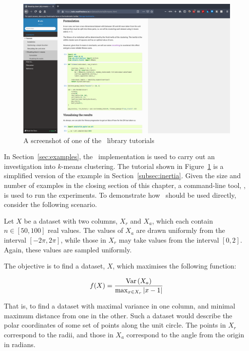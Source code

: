\graphicspath{{./}}
\begin{figure}[htbp]
    \centering
    \includegraphics[width=\imgwidth]{img/docs.png}
    \caption{A screenshot of one of the \edo\ library tutorials}
    \label{fig:docs}
\end{figure}

In Section~\ref{sec:examples}, the \edo\ implementation is used to carry out an
investigation into \(k\)-means clustering. The tutorial shown in
Figure~\ref{fig:docs} is a simplified version of the example in
Section~\ref{subsec:inertia}. Given the size and number of examples in the
closing section of this chapter, a command-line tool, \edolab, is used to run
the experiments. To demonstrate how \edo\ should be used directly, consider the
following scenario.

Let \(X\) be a dataset with two columns, \(X_r\) and \(X_a\), which each contain
\(n \in [50, 100]\) real values. The values of \(X_a\) are drawn uniformly from
the interval \([-2\pi, 2\pi]\), while those in \(X_r\) may take values from the
interval \([0, 2]\). Again, these values are sampled uniformly.

The objective is to find a dataset, \(X\), which maximises the following
function:

\begin{equation}\label{eq:circle}
    f(X) = \frac{\text{Var}\left(X_{a}\right)}{%
        \max_{x \in X_r} \left|x - 1\right|%
    }
\end{equation}

That is, to find a dataset with maximal variance in one column, and minimal
maximum distance from one in the other. Such a dataset would describe the polar
coordinates of some set of points along the unit circle. The points in
\(X_r\) correspond to the radii, and those in \(X_a\) correspond to the angle
from the origin in radians.

